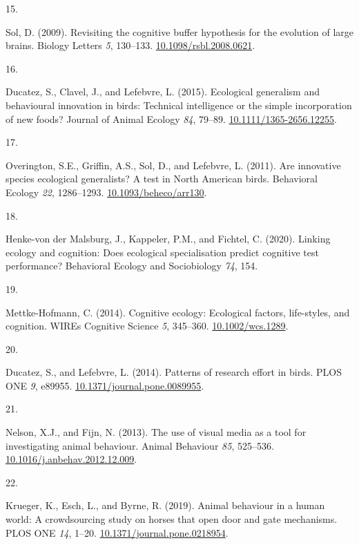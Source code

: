 \documentclass[
  man, donotrepeattitle,floatsintext]{apa6}
\newlength{\cslhangindent}
\newlength{\csllabelwidth}
\newlength{\cslentryspacingunit} %
\newenvironment{CSLReferences}[2] %
 {%
  \setlength{\parindent}{0pt}
  \ifodd #1
  \let\oldpar\par
  \def\par{\hangindent=\cslhangindent\oldpar}
  \fi
  \setlength{\parskip}{#2\cslentryspacingunit}
 }%
 {}
\newcommand{\CSLLeftMargin}[1]{\parbox[t]{\csllabelwidth}{#1}}
\newcommand{\CSLRightInline}[1]{\parbox[t]{\linewidth - \csllabelwidth}{#1}\break}
\begin{document}
\begin{CSLReferences}{0}{0}
\leavevmode{}%
\CSLLeftMargin{15. }%
\CSLRightInline{Sol, D. (2009). Revisiting the cognitive buffer hypothesis for the evolution of large brains. Biology Letters \emph{5}, 130--133. \href{https://doi.org/10.1098/rsbl.2008.0621}{10.1098/rsbl.2008.0621}.}

\leavevmode{}%
\CSLLeftMargin{16. }%
\CSLRightInline{Ducatez, S., Clavel, J., and Lefebvre, L. (2015). Ecological generalism and behavioural innovation in birds: Technical intelligence or the simple incorporation of new foods? Journal of Animal Ecology \emph{84}, 79--89. \href{https://doi.org/10.1111/1365-2656.12255}{10.1111/1365-2656.12255}.}

\leavevmode{}%
\CSLLeftMargin{17. }%
\CSLRightInline{Overington, S.E., Griffin, A.S., Sol, D., and Lefebvre, L. (2011). Are innovative species ecological generalists? A test in {N}orth {A}merican birds. Behavioral Ecology \emph{22}, 1286--1293. \href{https://doi.org/10.1093/beheco/arr130}{10.1093/beheco/arr130}.}

\leavevmode{}%
\CSLLeftMargin{18. }%
\CSLRightInline{Henke-von der Malsburg, J., Kappeler, P.M., and Fichtel, C. (2020). Linking ecology and cognition: Does ecological specialisation predict cognitive test performance? Behavioral Ecology and Sociobiology \emph{74}, 154.}

\leavevmode{}%
\CSLLeftMargin{19. }%
\CSLRightInline{Mettke-Hofmann, C. (2014). Cognitive ecology: Ecological factors, life-styles, and cognition. WIREs Cognitive Science \emph{5}, 345--360. \href{https://doi.org/10.1002/wcs.1289}{10.1002/wcs.1289}.}

\leavevmode{}%
\CSLLeftMargin{20. }%
\CSLRightInline{Ducatez, S., and Lefebvre, L. (2014). Patterns of research effort in birds. PLOS ONE \emph{9}, e89955. \href{https://doi.org/10.1371/journal.pone.0089955}{10.1371/journal.pone.0089955}.}

\leavevmode{}%
\CSLLeftMargin{21. }%
\CSLRightInline{Nelson, X.J., and Fijn, N. (2013). The use of visual media as a tool for investigating animal behaviour. Animal Behaviour \emph{85}, 525--536. \href{https://doi.org/10.1016/j.anbehav.2012.12.009}{10.1016/j.anbehav.2012.12.009}.}

\leavevmode{}%
\CSLLeftMargin{22. }%
\CSLRightInline{Krueger, K., Esch, L., and Byrne, R. (2019). Animal behaviour in a human world: A crowdsourcing study on horses that open door and gate mechanisms. PLOS ONE \emph{14}, 1--20. \href{https://doi.org/10.1371/journal.pone.0218954}{10.1371/journal.pone.0218954}.}


\end{CSLReferences}
\end{document}
